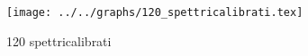 \begin{figure}[h] \centering\texttt{[image: ../../graphs/120\_spettricalibrati.tex]}\caption{120 spettricalibrati}\label{gr:120_spettricalibrati} \end{figure}
